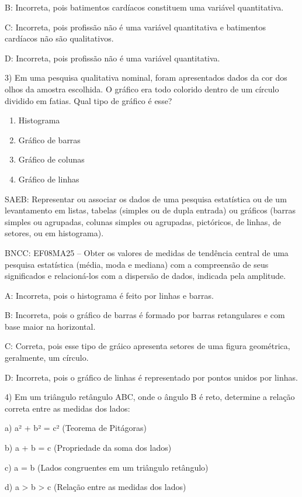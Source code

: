 B: Incorreta, pois batimentos cardíacos constituem uma variável
quantitativa.

C: Incorreta, pois profissão não é uma variável quantitativa e
batimentos cardíacos não são qualitativos.

D: Incorreta, pois profissão não é uma variável quantitativa.

3) Em uma pesquisa qualitativa nominal, foram apresentados dados da cor
dos olhos da amostra escolhida. O gráfico era todo colorido dentro de um
círculo dividido em fatias. Qual tipo de gráfico é esse?

\begin{enumerate}
\def\labelenumi{\alph{enumi}.}
\item
  Histograma
\item
  Gráfico de barras
\item
  Gráfico de colunas
\item
  Gráfico de linhas~
\end{enumerate}

SAEB: Representar ou associar os dados de uma pesquisa estatística ou de
um levantamento em listas, tabelas (simples ou de dupla entrada) ou
gráficos (barras simples ou agrupadas, colunas simples ou agrupadas,
pictóricos, de linhas, de setores, ou em histograma).

BNCC: EF08MA25 -- Obter os valores de medidas de tendência central de
uma pesquisa estatística (média, moda e mediana) com a compreensão de
seus significados e relacioná-los com a dispersão de dados, indicada
pela amplitude.

A: Incorreta, pois o histograma é feito por linhas e barras.

B: Incorreta, pois o gráfico de barras é formado por barras retangulares
e com base maior na horizontal.

C: Correta, pois esse tipo de gráico apresenta setores de uma figura
geométrica, geralmente, um círculo.

D: Incorreta, pois o gráfico de linhas é representado por pontos unidos
por linhas.

4) Em um triângulo retângulo ABC, onde o ângulo B é reto, determine a
relação correta entre as medidas dos lados:

a) a² + b² = c² (Teorema de Pitágoras)

b) a + b = c (Propriedade da soma dos lados)

c) a = b (Lados congruentes em um triângulo retângulo)

d) a \textgreater{} b \textgreater{} c (Relação entre as medidas dos
lados)

